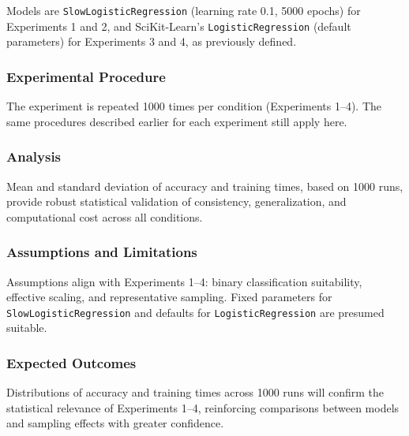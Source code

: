 \documentclass{article}
\theoremstyle{plain}
\theoremstyle{definition}
\theoremstyle{remark}
\begin{document}
Models are \texttt{SlowLogisticRegression} (learning rate 0.1, 5000 epochs) for Experiments 1 and 2, and SciKit-Learn's \texttt{LogisticRegression} (default parameters) for Experiments 3 and 4, as previously defined.

\subsubsection{Experimental Procedure}

The experiment is repeated 1000 times per condition (Experiments 1–4). The same procedures described earlier for each experiment still apply here.

\subsubsection{Analysis}

Mean and standard deviation of accuracy and training times, based on 1000 runs, provide robust statistical validation of consistency, generalization, and computational cost across all conditions.

\subsubsection{Assumptions and Limitations}

Assumptions align with Experiments 1–4: binary classification suitability, effective scaling, and representative sampling. Fixed parameters for \texttt{SlowLogisticRegression} and defaults for \texttt{LogisticRegression} are presumed suitable.

\subsubsection{Expected Outcomes}

Distributions of accuracy and training times across 1000 runs will confirm the statistical relevance of Experiments 1–4, reinforcing comparisons between models and sampling effects with greater confidence.


\end{document}
